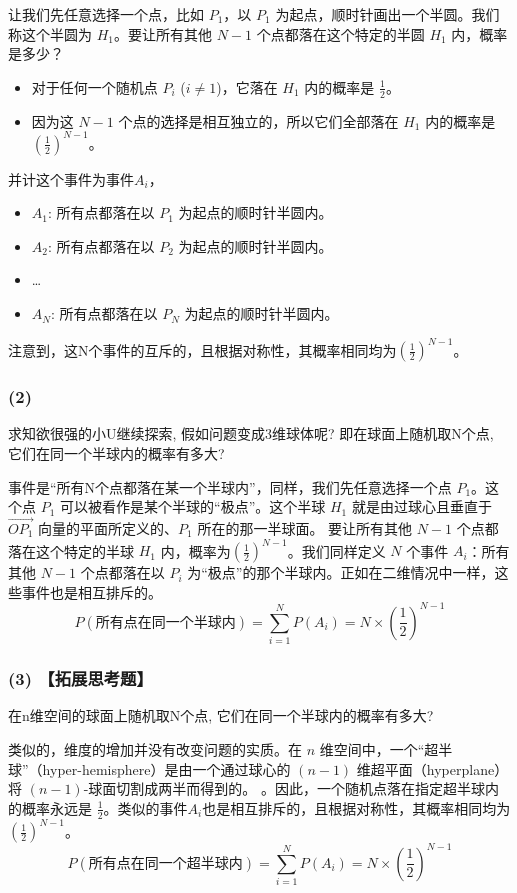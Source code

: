\documentclass[UTF8]{ctexart}
\begin{document}
让我们先任意选择一个点，比如 \(P_1\)，以 $P_1$ 为起点，顺时针画出一个半圆。我们称这个半圆为 $H_1$。要让所有其他 $N-1$ 个点都落在这个特定的半圆 $H_1$ 内，概率是多少？
\begin{itemize}
    \item 对于任何一个随机点 $P_i$ ($i \neq 1$)，它落在 $H_1$ 内的概率是 $\frac{1}{2}$。
    \item 因为这 $N-1$ 个点的选择是相互独立的，所以它们全部落在 $H_1$ 内的概率是 $(\frac{1}{2})^{N-1}$。
\end{itemize}
并计这个事件为事件$A_i$，
\begin{itemize}
    \item $A_1$: 所有点都落在以 $P_1$ 为起点的顺时针半圆内。
    \item $A_2$: 所有点都落在以 $P_2$ 为起点的顺时针半圆内。
    \item \dots
    \item $A_N$: 所有点都落在以 $P_N$ 为起点的顺时针半圆内。
\end{itemize}
注意到，这N个事件的互斥的，且根据对称性，其概率相同均为$(\frac{1}{2})^{N-1}$。
\subsubsection*{(2)}
求知欲很强的小U继续探索, 假如问题变成3维球体呢? 即在球面上随机取N个点, 它们在同一个半球内的概率有多大?

事件是“所有N个点都落在某一个半球内”，同样，我们先任意选择一个点 $P_1$。这个点 $P_1$ 可以被看作是某个半球的“极点”。这个半球 $H_1$ 就是由过球心且垂直于 $\vec{OP_1}$ 向量的平面所定义的、$P_1$ 所在的那一半球面。
要让所有其他 $N-1$ 个点都落在这个特定的半球 $H_1$ 内，概率为$(\frac{1}{2})^{N-1}$。我们同样定义 $N$ 个事件 $A_i$：所有其他 $N-1$ 个点都落在以 $P_i$ 为“极点”的那个半球内。正如在二维情况中一样，这些事件也是相互排斥的。
$$ P(\text{所有点在同一个半球内}) = \sum_{i=1}^{N} P(A_i) = N \times \left(\frac{1}{2}\right)^{N-1} $$
\subsubsection*{(3) 【拓展思考题】}
在n维空间的球面上随机取N个点, 它们在同一个半球内的概率有多大?

类似的，维度的增加并没有改变问题的实质。在 $n$ 维空间中，一个“超半球”（hyper-hemisphere）是由一个通过球心的 $(n-1)$ 维超平面（hyperplane）将 $(n-1)$-球面切割成两半而得到的。
。因此，一个随机点落在指定超半球内的概率永远是 $\frac{1}{2}$。类似的事件$A_i$也是相互排斥的，且根据对称性，其概率相同均为$(\frac{1}{2})^{N-1}$。
$$ P(\text{所有点在同一个超半球内}) = \sum_{i=1}^{N} P(A_i) = N \times \left(\frac{1}{2}\right)^{N-1} $$
\end{document}
